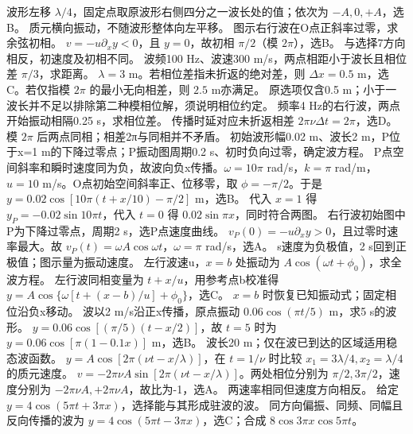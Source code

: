 \workings 波形左移 $\lambda/4$，固定点取原波形右侧四分之一波长处的值；依次为 $-A,0,+A$，选B。
\crosscheck 质元横向振动，不随波形整体向左平移。
\problemtext 图示右行波在O点正斜率过零，求余弦初相。
\workings $v=-u\partial_x y<0$，且 $y=0$，故初相 $\pi/2$（模 $2\pi$），选B。
\crosscheck 与选择7方向相反，初速度及初相不同。
\problemtext 波频100 Hz、波速300 m/s，两点相距小于波长且相位差 $\pi/3$，求距离。
\workings $\lambda=3$ m。若相位差指未折返的绝对差，则 $\Delta x=0.5$ m，选C。若仅指模 $2\pi$ 的最小无向相差，则 $2.5$ m亦满足。
\crosscheck 原选项仅含0.5 m；小于一波长并不足以排除第二种模相位解，须说明相位约定。
\problemtext 频率4 Hz的右行波，两点开始振动相隔0.25 s，求相位差。
\workings 传播时延对应未折返相差 $2\pi\nu\Delta t=2\pi$，选D。
\crosscheck 模 $2\pi$ 后两点同相；相差2π与同相并不矛盾。
\problemtext 初始波形幅0.02 m、波长2 m，P位于x=1 m的下降过零点；P振动图周期0.2 s、初时负向过零，确定波方程。
\workings P点空间斜率和瞬时速度同为负，故波向负x传播。$\omega=10\pi$ rad/s，$k=\pi$ rad/m，$u=10$ m/s。O点初始空间斜率正、位移零，取 $\phi=-\pi/2$。于是 $y=0.02\cos[10\pi(t+x/10)-\pi/2]$ m，选B。
\crosscheck 代入 $x=1$ 得 $y_P=-0.02\sin10\pi t$，代入 $t=0$ 得 $0.02\sin\pi x$，同时符合两图。
\problemtext 右行波初始图中P为下降过零点，周期2 s，选P点速度曲线。
\workings $v_P(0)=-u\partial_x y>0$，且过零时速率最大。故 $v_P(t)=\omega A\cos\omega t$，$\omega=\pi$ rad/s，选A。
 s速度为负极值，2 s回到正极值；图示量为振动速度。
\problemtext 左行波速u，$x=b$ 处振动为 $A\cos(\omega t+\phi_0)$，求全波方程。
\workings 左行波同相变量为 $t+x/u$，用参考点b校准得 $y=A\cos\{\omega[t+(x-b)/u]+\phi_0\}$，选C。
\crosscheck $x=b$ 时恢复已知振动式；固定相位沿负x移动。
\problemtext 波以2 m/s沿正x传播，原点振动 $0.06\cos(\pi t/5)$ m，求5 s的波形。
\workings $y=0.06\cos[(\pi/5)(t-x/2)]$，故 $t=5$ 时为 $y=0.06\cos[\pi(1-0.1x)]$ m，选B。
\crosscheck 波长20 m；仅在波已到达的区域适用稳态波函数。
\problemtext $y=A\cos[2\pi(\nu t-x/\lambda)]$，在 $t=1/\nu$ 时比较 $x_1=3\lambda/4,x_2=\lambda/4$ 的质元速度。
\workings $v=-2\pi\nu A\sin[2\pi(\nu t-x/\lambda)]$。两处相位分别为 $\pi/2,3\pi/2$，速度分别为 $-2\pi\nu A,+2\pi\nu A$，故比为-1，选A。
\crosscheck 两速率相同但速度方向相反。
\problemtext 给定 $y=4\cos(5\pi t+3\pi x)$，选择能与其形成驻波的波。
\workings 同方向偏振、同频、同幅且反向传播的波为 $y=4\cos(5\pi t-3\pi x)$，选C；合成 $8\cos3\pi x\cos5\pi t$。
